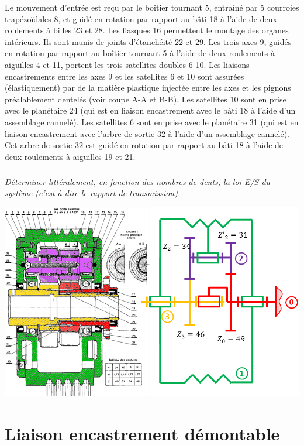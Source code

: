 \documentclass[10pt,fleqn]{article} %
\begin{document}
\begin{multicols}{2}
Le mouvement d’entrée est reçu par le boîtier tournant 5, entraîné par 5 courroies trapézoïdales 8, et guidé en rotation par rapport au bâti 18 à l’aide de deux roulements à billes 23 et 28. 
Les flasques 16 permettent le montage des organes intérieurs. Ils sont munis de joints d’étanchéité 22 et 29. 
Les trois axes 9, guidés en rotation par rapport au boîtier tournant 5 à l’aide de deux roulements à aiguilles 4 et 11, portent les trois satellites doubles 6-10.
Les liaisons encastrements entre les axes 9 et les satellites 6 et 10 sont assurées (élastiquement) par de la matière plastique injectée entre les axes et les pignons préalablement dentelés (voir coupe A-A et B-B). 
Les satellites 10 sont en prise avec le planétaire 24 (qui est en liaison encastrement avec le bâti 18 à l’aide d’un assemblage cannelé).
Les satellites 6 sont en prise avec le planétaire 31 (qui est en liaison encastrement avec l’arbre de sortie 32 à l’aide d’un assemblage cannelé). Cet arbre de sortie 32 est guidé en rotation par rapport au bâti 18 à l’aide de deux roulements à aiguilles 19 et 21.



\subparagraph{}
\textit{Déterminer littéralement, en fonction des nombres de dents, la loi E/S du système (c'est-à-dire le rapport de transmission).}


%
%
%

\begin{center}
\includegraphics[width=\linewidth]{images/redex_04}
\end{center}


\section*{Liaison encastrement démontable}
\setcounter{exo}{0}


\end{multicols}
\end{document}
